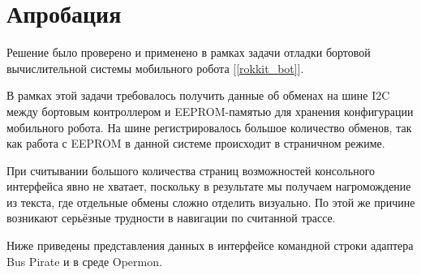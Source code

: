 \section{Апробация}

\label{testing}

Решение было проверено и применено в рамках задачи отладки бортовой вычислительной системы мобильного робота [\ref{rokkit_bot}].

В рамках этой задачи требовалось получить данные об обменах на шине I2C между бортовым контроллером и EEPROM-памятью для хранения конфигурации мобильного робота. На шине регистрировалось большое количество обменов, так как работа с EEPROM в данной системе происходит в страничном режиме.

При считывании большого количества страниц возможностей консольного интерфейса явно не хватает, поскольку в результате мы получаем нагромождение из текста, где отдельные обмены сложно отделить визуально. По этой же причине возникают серьёзные трудности в навигации по считанной трассе.

Ниже приведены представления данных в интерфейсе командной строки адаптера Bus Pirate и в среде Opermon.

